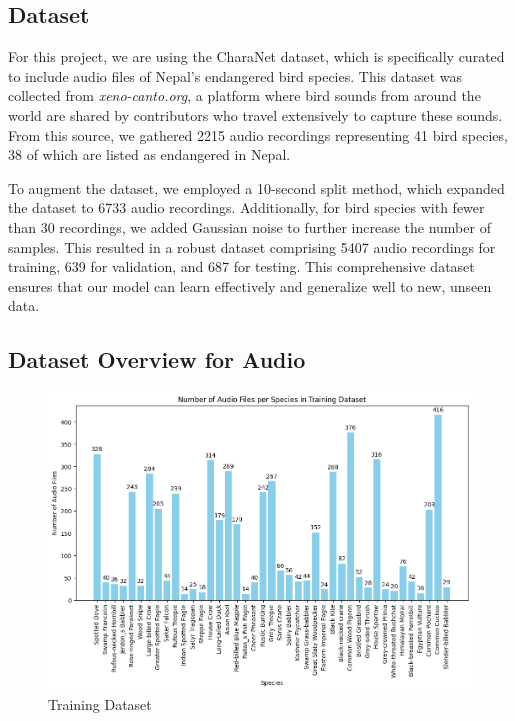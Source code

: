 \subsection{Dataset}

For this project, we are using the CharaNet dataset, which is specifically curated to include audio files of Nepal's endangered bird species. This dataset was collected from \textit{xeno-canto.org}, a platform where bird sounds from around the world are shared by contributors who travel extensively to capture these sounds. From this source, we gathered 2215 audio recordings representing 41 bird species, 38 of which are listed as endangered in Nepal.

To augment the dataset, we employed a 10-second split method, which expanded the dataset to 6733 audio recordings. Additionally, for bird species with fewer than 30 recordings, we added Gaussian noise to further increase the number of samples. This resulted in a robust dataset comprising 5407 audio recordings for training, 639 for validation, and 687 for testing. This comprehensive dataset ensures that our model can learn effectively and generalize well to new, unseen data.
\newpage
\subsection{Dataset Overview for Audio}
\begin{figure}[h!]
    \centering
    \includegraphics[scale=0.4]{images/TrainingDataset.png}
    \caption{Training Dataset}
\end{figure}

